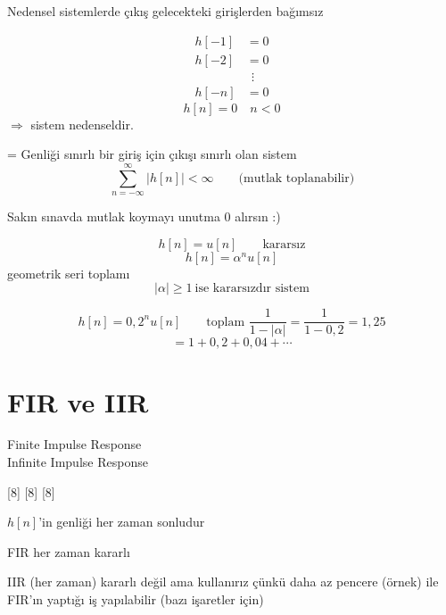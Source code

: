 \documentclass[11pt,a4paper]{article}
\begin{document}
Nedensel sistemlerde çıkış gelecekteki girişlerden bağımsız

\begin{align*}
h[-1] &= 0\\
h[-2] &= 0\\
&\ \ \vdots\\
h[-n] &= 0
\end{align*}
\[ h[n]=0 \quad n<0 \]
$\Rightarrow$ sistem nedenseldir.

 = Genliği sınırlı bir giriş için çıkışı sınırlı olan sistem
\[ \sum_{n=-\infty}^{\infty} |h[n]| < \infty \qquad \text{(mutlak toplanabilir)} \]

\begin{dikkat}
Sakın sınavda mutlak koymayı unutma 0 alırsın :)
\end{dikkat}

\[ h[n]=u[n] \qquad \text{kararsız} \]
\[ h[n]=\alpha^{n}u[n] \]
geometrik seri toplamı
\[ |\alpha|\ge 1 \ \text{ise kararsızdır sistem} \]

\[ h[n]=0{,}2^{n}u[n] \qquad \text{toplam } \frac{1}{1-|\alpha|}=\frac{1}{1-0{,}2}=1{,}25 \]
\[ = 1+0{,}2+0{,}04+\cdots \]

\section{FIR ve IIR}
Finite Impulse Response\\
Infinite Impulse Response

[8]
[8]
[8]

$h[n]$'in genliği her zaman sonludur

FIR her zaman kararlı

IIR (her zaman) kararlı değil ama kullanırız çünkü daha az pencere (örnek) ile FIR'ın yaptığı iş yapılabilir (bazı işaretler için)
\end{document}

